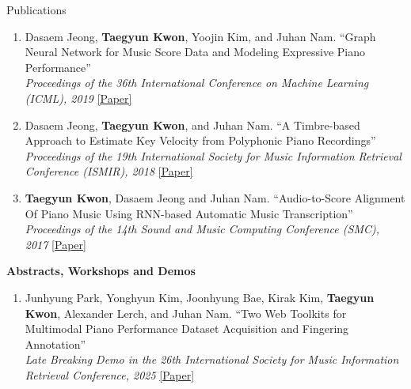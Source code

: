 \begin{rSection}{Publications}
\begin{enumerate}
\begin{minipage}[t]{\linewidth}
``A Cross-Scape Plot Representation for Visualizing Symbolic Melodic Similarity''\\\textit{Proceedings of the 20th International Society for Music Information Retrieval Conference (ISMIR), 2019}
\href{http://archives.ismir.net/ismir2019/paper/000050.pdf}{[Paper]}
\end{minipage}
\item \begin{minipage}[t]{\linewidth}Dasaem Jeong, \textbf{Taegyun Kwon}, Yoojin Kim, and Juhan Nam.
``Graph Neural Network for Music Score Data and Modeling Expressive Piano Performance''\\\textit{Proceedings of the 36th International Conference on Machine Learning (ICML), 2019}
\href{http://proceedings.mlr.press/v97/jeong19a/jeong19a.pdf}{[Paper]}
\end{minipage}
\item \begin{minipage}[t]{\linewidth}Dasaem Jeong, \textbf{Taegyun Kwon}, and Juhan Nam.
``A Timbre-based Approach to Estimate Key Velocity from Polyphonic Piano Recordings''\\\textit{Proceedings of the 19th International Society for Music Information Retrieval Conference (ISMIR), 2018}
\href{http://ismir2018.ircam.fr/doc/pdfs/196_Paper.pdf}{[Paper]}
\end{minipage}
\item \begin{minipage}[t]{\linewidth}\textbf{Taegyun Kwon}, Dasaem Jeong and Juhan Nam.
``Audio-to-Score Alignment Of Piano Music Using RNN-based Automatic Music Transcription''\\\textit{Proceedings of the 14th Sound and Music Computing Conference (SMC), 2017}
\href{https://arxiv.org/pdf/1711.04480}{[Paper]}
\end{minipage}
\end{enumerate}
\textbf{Abstracts, Workshops and Demos}
\begin{enumerate}
\item \begin{minipage}[t]{\linewidth}Junhyung Park, Yonghyun Kim, Joonhyung Bae, Kirak Kim, \textbf{Taegyun Kwon}, Alexander Lerch, and Juhan Nam.
``Two Web Toolkits for Multimodal Piano Performance Dataset Acquisition and Fingering Annotation''\\\textit{Late Breaking Demo in the 26th International Society for Music Information Retrieval Conference, 2025}
\href{https://arxiv.org/abs/2509.15222}{[Paper]}
\end{minipage}

\end{enumerate}
\end{rSection}
